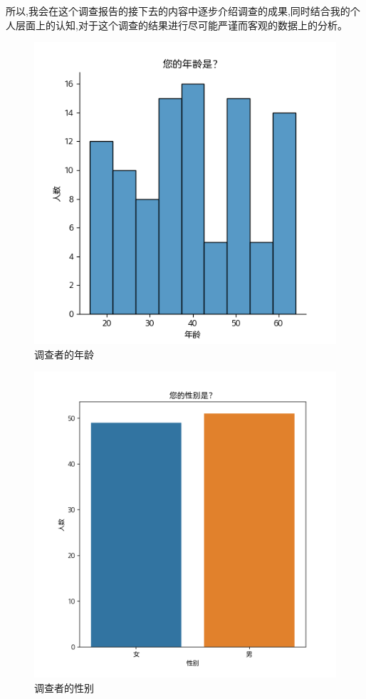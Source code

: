 \documentclass[AutoFakeBold]{LZUThesis}
\begin{document}
所以,我会在这个调查报告的接下去的内容中逐步介绍调查的成果,同时结合我的个人层面上的认知,对于这个调查的结果进行尽可能严谨而客观的数据上的分析。

\begin{figure}[!h]
	\centering
	\includegraphics[width=4 in]{figures/age.png}
	\caption{调查者的年龄}
	\label{fig:age}
\end{figure}

\begin{figure}[!h]
	\centering
	\includegraphics[width=4 in]{figures/sex.png}
	\caption{调查者的性别}
	\label{fig:sex}
\end{figure}
\end{document}
